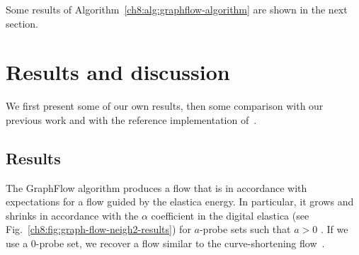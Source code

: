 \documentclass[runningheads]{llncs}
\newcommand{\daniel}[1]{ {\color{black}#1} }
\begin{document}
Some results of Algorithm~\ref{ch8:alg:graphflow-algorithm} are shown in the next section.

\section{Results and discussion}
We first present some of our own results, then some comparison with our previous work and with the reference
implementation of~\cite{schoenemann09linear}.

\subsection{Results}
The GraphFlow algorithm produces a flow that is in accordance with expectations for a flow guided by the elastica
energy. In particular, it grows and shrinks in accordance with the $\alpha$ coefficient in the digital elastica
(see Fig.~\ref{ch8:fig:graph-flow-neigh2-results}) \daniel{for $a$-probe sets such that $a>0$}. \daniel{If we use a $0$-probe set, we recover a flow similar to the curve-shortening flow~\cite{huisken84flow}.}
\end{document}
